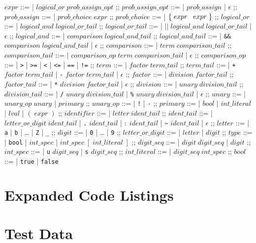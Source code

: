 \documentclass[11pt]{report}
\def\code#1{\texttt{#1}}
\begin{document}
\pagebreak

\begin{bnf}
  $expr$ ::=
  | $logical\_or\;prob\_assign\_opt$
  ;;
  $prob\_assign\_opt$ ::=
  | $prob\_assign$
  | $\epsilon$
  ;;
  $prob\_assign$ ::=
  | $prob\_choice\;expr$
  ;;
  $prob\_choice$ ::=
  | $\left\{\;expr\;\code{\:}\;expr\;\right\}$
  ;;
  $logical\_or$ ::=
  | $logical\_and\;logical\_or\_tail$
  ;;
  $logical\_or\_tail$ ::=
  | $\vert\vert\; logical\_and\;logical\_or\_tail$
  | $\epsilon$
  ;;
  $logical\_and$ ::=
  | $comparison\;logical\_and\_tail$
  ;;
  $logical\_and\_tail$ ::=
  | \code{\&\&} $comparison\;logical\_and\_tail$
  | $\epsilon$
  ;;
  $comparison$ ::=
  | $term\;comparison\_tail$
  ;;
  $comparison\_tail$ ::=
  | $comparison\_op\;term\;comparison\_tail$
  | $\epsilon$
  ;;
  $comparison\_op$ ::=
  | \code{>}
  | \code{>=}
  | \code{<}
  | \code{<=}
  | \code{==}
  | \code{!=}
  ;;
  $term$ ::=
  | $factor\;term\_tail$
  ;;
  $term\_tail$ ::=
  | \code{+} $factor\;term\_tail$
  | \code{-} $factor\;term\_tail$
  | $\epsilon$
  ;;
  $factor$ ::=
  | $division\;factor\_tail$
  ;;
  $factor\_tail$ ::=
  | \code{*} $division\;factor\_tail$
  | $\epsilon$
  ;;
  $division$ ::=
  | $unary\;division\_tail$
  ;;
  $division\_tail$ ::=
  | \code{/} $unary\;division\_tail$
  | \code{\%} $unary\;division\_tail$
  | $\epsilon$
  ;;
  $unary$ ::=
  | $unary\_op\;unary$
  | $primary$
  ;;
  $unary\_op$ ::=
  | \code{!}
  | \code{-}
  ;;
  $primary$ ::=
  | $bool$
  | $int\_literal$
  | $lval$
  | $\left(\;expr\;\right)$
  ;;
  $identifier$ ::=
  | $letter\;ident\_tail$
  ;;
  $ident\_tail$ ::=
  | $letter\_or\_digit\;ident\_tail$
  | \code{.} $ident\_tail$
  | $\colon\; ident\_tail$
  | \code{\~} $ident\_tail$
  | $\epsilon$
  ;;
  $letter$ ::=
  | \code{a}
  | \code{b}
  | …
  | \code{Z}
  | \code{\_}
  ;;
  $digit$ ::=
  | \code{0}
  | …
  | \code{9}
  ;;
  $letter\_or\_digit$ ::=
  | $letter$
  | $digit$
  ;;
  $type$ ::=
  | \code{bool}
  | $int\_spec$
  | $int\_spec\;\left[\;int\_literal\;\right]$
  ;;
  $digit\_seq$ ::=
  | $digit\;digit\_seq$
  | $digit$
  ;;
  $int\_spec$ ::=
  | \code{u} $digit\_seq$
  | \code{s} $digit\_seq$
  ;;
  $int\_literal$ ::=
  | $digit\_seq\;int\_spec$
  ;;
  $bool$ ::=
  | \code{true}
  | \code{false}
\end{bnf}



\chapter{Expanded Code Listings}

\chapter{Test Data}
\end{document}
